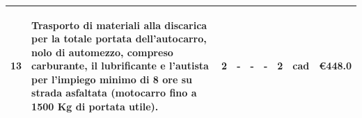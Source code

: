 \documentclass[a4paper]{article}
\begin{document}
\begin{tabular}{ | L{6.1mm} |  L{52.4mm} |  L{7mm} | L{7mm} | L{7mm} | L{7mm} | L{8mm} | L{8mm} | L{16mm} |   }
                        \vspace{2.5mm}\begin{spacing}{0}13\end{spacing} &\vspace{2.5mm}\begin{spacing}{0}Trasporto di materiali alla discarica per la totale portata dell'autocarro, nolo di automezzo, compreso carburante, il lubrificante e l'autista per l'impiego minimo di 8 ore su strada asfaltata (motocarro fino a 1500 Kg di portata utile).\end{spacing} &\vspace{2.5mm}\begin{spacing}{0}2\end{spacing} &\vspace{2.5mm}\begin{spacing}{0}-\end{spacing} &\vspace{2.5mm}\begin{spacing}{0}-\end{spacing} &\vspace{2.5mm}\begin{spacing}{0}-\end{spacing} &\vspace{2.5mm}\begin{spacing}{0}2\end{spacing} &\vspace{2.5mm}\begin{spacing}{0}cad\end{spacing} &\vspace{2.5mm}\begin{spacing}{0}\euro\hfill  448.0
                        \end{spacing} \\ \hline %


\end{tabular}
\end{document}
